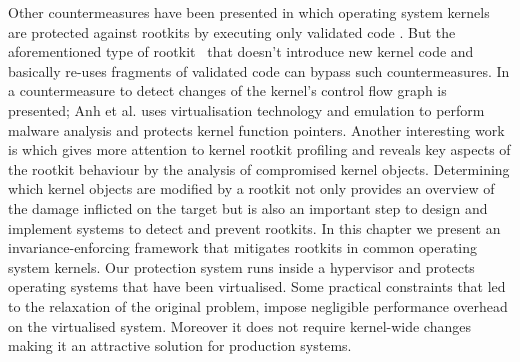 Other countermeasures have been presented in which operating system kernels are protected against rootkits by executing only validated code \cite{SecVisor,NICKLE,5}. But the aforementioned type of rootkit~\cite{Hund2009} that doesn't introduce new kernel code and basically re-uses fragments of validated code can bypass such countermeasures.
In \cite{4} a countermeasure to detect changes of the kernel's control flow graph is presented; Anh et al. \cite{MAVMM} uses virtualisation technology and emulation to perform malware analysis and \cite{HookSafe} protects kernel function pointers. Another interesting work is \cite{PoKer} which gives more attention to kernel rootkit profiling and reveals key aspects of the rootkit behaviour by the analysis of compromised kernel objects. 
Determining which kernel objects are modified by a rootkit not only provides an overview of the damage inflicted on the target but is also an important step to design and implement systems to detect and prevent rootkits.
In this chapter we present an invariance-enforcing framework that mitigates rootkits in common operating system kernels. 
Our protection system runs inside a hypervisor and protects operating systems that have been virtualised. 
Some practical constraints that led to the relaxation of the original problem, impose negligible performance overhead on the virtualised system.
Moreover it does not require kernel-wide changes making it an attractive solution for production systems.
